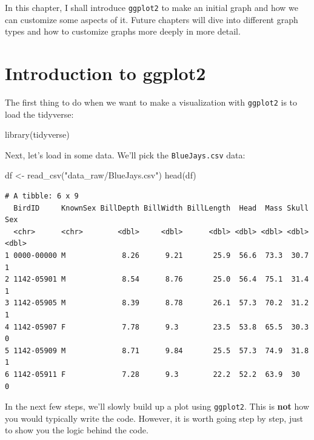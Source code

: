 \documentclass[
  letterpaper,
  DIV=11,
  numbers=noendperiod]{scrreprt}
\newenvironment{Shaded}{\begin{snugshade}}{\end{snugshade}}
\newcommand{\FunctionTok}[1]{\textcolor[rgb]{0.28,0.35,0.67}{#1}}
\newcommand{\NormalTok}[1]{\textcolor[rgb]{0.00,0.23,0.31}{#1}}
\newcommand{\OtherTok}[1]{\textcolor[rgb]{0.00,0.23,0.31}{#1}}
\newcommand{\StringTok}[1]{\textcolor[rgb]{0.13,0.47,0.30}{#1}}
\begin{document}
In this chapter, I shall introduce \texttt{ggplot2} to make an initial
graph and how we can customize some aspects of it. Future chapters will
dive into different graph types and how to customize graphs more deeply
in more detail.

\hypertarget{introduction-to-ggplot2}{%
\section{Introduction to ggplot2}\label{introduction-to-ggplot2}}

The first thing to do when we want to make a visualization with
\texttt{ggplot2} is to load the tidyverse:

\begin{Shaded}
\begin{Highlighting}[]
\FunctionTok{library}\NormalTok{(tidyverse)}
\end{Highlighting}
\end{Shaded}

Next, let's load in some data. We'll pick the \texttt{BlueJays.csv}
data:

\begin{Shaded}
\begin{Highlighting}[]
\NormalTok{df }\OtherTok{\textless{}{-}} \FunctionTok{read\_csv}\NormalTok{(}\StringTok{"data\_raw/BlueJays.csv"}\NormalTok{)}
\FunctionTok{head}\NormalTok{(df)}
\end{Highlighting}
\end{Shaded}

\begin{verbatim}
# A tibble: 6 x 9
  BirdID     KnownSex BillDepth BillWidth BillLength  Head  Mass Skull   Sex
  <chr>      <chr>        <dbl>     <dbl>      <dbl> <dbl> <dbl> <dbl> <dbl>
1 0000-00000 M             8.26      9.21       25.9  56.6  73.3  30.7     1
2 1142-05901 M             8.54      8.76       25.0  56.4  75.1  31.4     1
3 1142-05905 M             8.39      8.78       26.1  57.3  70.2  31.2     1
4 1142-05907 F             7.78      9.3        23.5  53.8  65.5  30.3     0
5 1142-05909 M             8.71      9.84       25.5  57.3  74.9  31.8     1
6 1142-05911 F             7.28      9.3        22.2  52.2  63.9  30       0
\end{verbatim}

In the next few steps, we'll slowly build up a plot using
\texttt{ggplot2}. This is \textbf{not} how you would typically write the
code. However, it is worth going step by step, just to show you the
logic behind the code.
\end{document}

